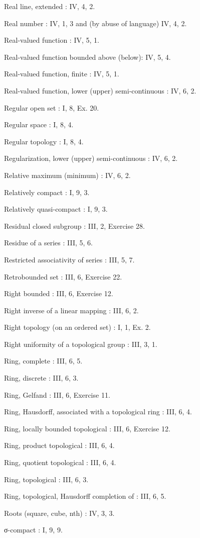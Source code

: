 Real line, extended : IV, 4, 2.

Real number : IV, 1, 3 and (by abuse of language) IV, 4, 2.

Real-valued function : IV, 5, 1.

Real-valued function bounded above (below): IV, 5, 4.

Real-valued function, finite : IV, 5, 1.

Real-valued function, lower (upper) semi-continuous : IV, 6, 2.

Regular open set : I, 8, Ex. 20.

Regular space : I, 8, 4.

Regular topology : I, 8, 4.

Regularization, lower (upper) semi-continuous : IV, 6, 2.

Relative maximum (minimum) : IV, 6, 2.

Relatively compact : I, 9, 3.

Relatively quasi-compact : I, 9, 3.

Residual closed subgroup : III, 2, Exercise 28.

Residue of a series : III, 5, 6.

Restricted associativity of series : III, 5, 7.

Retrobounded set : III, 6, Exercise 22.

Right bounded : III, 6, Exercise 12.

Right inverse of a linear mapping : III, 6, 2.

Right topology (on an ordered set) : I, 1, Ex. 2.

Right uniformity of a topological group : III, 3, 1.

Ring, complete : III, 6, 5.

Ring, discrete : III, 6, 3.

Ring, Gelfand : III, 6, Exercise 11.

Ring, Hausdorff, associated with a topological ring : III, 6, 4.

Ring, locally bounded topological : III, 6, Exercise 12.

Ring, product topological : III, 6, 4.

Ring, quotient topological : III, 6, 4.

Ring, topological : III, 6, 3.

Ring, topological, Hausdorff completion of : III, 6, 5.

Roots (square, cube, nth) : IV, 3, 3.

σ-compact : I, 9, 9.

